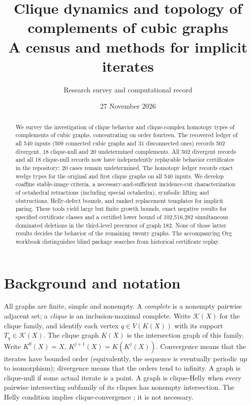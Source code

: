 \documentclass[11pt,a4paper]{article}
\title{Clique dynamics and topology of complements of cubic graphs\\\large A census and methods for implicit iterates}
\author{Research survey and computational record}
\date{27 November 2026}
\theoremstyle{definition}\newtheorem{definition}[theorem]{Definition}\newtheorem{example}[theorem]{Example}
\theoremstyle{remark}\newtheorem{remark}[theorem]{Remark}
\newcommand{\cl}{\mathcal K}
\begin{document}
\maketitle
\begin{abstract}
We survey the investigation of clique behavior and clique-complex homotopy types of complements of cubic graphs, concentrating on order fourteen. The recovered ledger of all 540 inputs (509 connected cubic graphs and 31 disconnected ones) records 502 divergent, 18 clique-null and 20 undetermined complements. All 502 divergent records and all 18 clique-null records now have independently replayable behavior certificates in the repository; 20 cases remain undetermined. The homotopy ledger records exact wedge types for the original and first clique graphs on all 540 inputs. We develop coaffine stable-image criteria, a necessary-and-sufficient incidence-cut characterization of octahedral retractions (including special octahedra), symbolic lifting and obstructions, Helly-defect bounds, and ranked replacement templates for implicit paring. These tools yield large but finite growth bounds, exact negative results for specified certificate classes and a certified lower bound of 102,516,282 simultaneous dominated deletions in the third-level precursor of graph 182. None of those latter results decides the behavior of the remaining twenty graphs. The accompanying Org workbook distinguishes blind package searches from historical certificate replay.
\end{abstract}
\tableofcontents
\section{Background and notation}
All graphs are finite, simple and nonempty. A \emph{complete} is a nonempty pairwise adjacent set; a \emph{clique} is an inclusion-maximal complete. Write \(\cl(X)\) for the clique family, and identify each vertex \(q\in V(K(X))\) with its support \(T_q\in\cl(X)\). The clique graph \(K(X)\) is the intersection graph of this family. Write \(K^0(X)=X\), \(K^{j+1}(X)=K(K^j(X))\). Convergence means that the iterates have bounded order (equivalently, the sequence is eventually periodic up to isomorphism); divergence means that the orders tend to infinity. A graph is clique-null if some actual iterate is a point. A graph is clique-Helly when every pairwise intersecting subfamily of its cliques has nonempty intersection. The Helly condition implies clique-convergence \cite{escalante}; it is not necessary.
\end{document}
